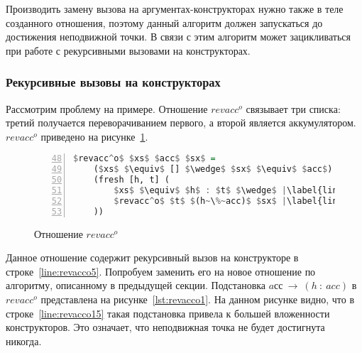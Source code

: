 Производить замену вызова на аргументах-конструкторах нужно также в теле созданного отношения, поэтому данный алгоритм должен запускаться до достижения неподвижной точки.
В связи с этим алгоритм может зацикливаться при работе с рекурсивными вызовами на конструкторах.


\subsubsection{Рекурсивные вызовы на конструкторах}

Рассмотрим проблему на примере.
Отношение $revacc^o$ связывает три списка: третий получается переворачиванием первого, а второй является аккумулятором.
$revacc^o$ приведено на рисунке~\ref{lst:revacco}.

\begin{figure}[h!]
  \begin{center}
  \begin{minipage}{0.4\textwidth}
  \begin{lstlisting}[language=Haskell, frame=single, numbers=left,numberstyle=\small, firstnumber=48, escapechar=|]
  $revacc^o$ $xs$ $acc$ $sx$ =
    ($xs$ $\equiv$ [] $\wedge$ $sx$ $\equiv$ $acc$) $\vee$ |\label{line:revacco2}|
    (fresh [h, t] (
        $xs$ $\equiv$ $h$ : $t$ $\wedge$ |\label{line:revacco4}|
        $revacc^o$ $t$ $(h~\%~acc)$ $sx$ |\label{line:revacco5}|
    ))
    \end{lstlisting}
  \end{minipage}
  \end{center}
  \caption{Отношение $revacc^o$}
  \label{lst:revacco}
\end{figure}

Данное отношение содержит рекурсивный вызов на конструкторе в строке~\ref{line:revacco5}.
Попробуем заменить его на новое отношение по алгоритму, описанному в предыдущей секции.
Подстановка $aсс~\rightarrow~(h~:~acc)$ в $revacc^o$ представлена на рисунке~\ref{lst:revacco1}.
На данном рисунке видно, что в строке~\ref{line:revacco15} такая подстановка привела к большей вложенности конструкторов.
Это означает, что неподвижная точка не будет достигнута никогда.

